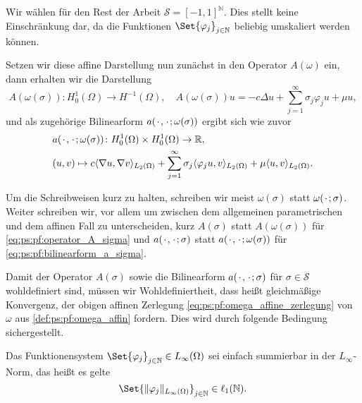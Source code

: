 \begin{Bemerkung}
    Wir wählen für den Rest der Arbeit $\mathcal S = [-1, 1]^{\mathbb{N}}$.
    Dies stellt keine Einschränkung dar, da die Funktionen $\Set{ \varphi_{j} }_{j \in \mathbb{N}}$ beliebig umskaliert werden können.
\end{Bemerkung}

Setzen wir diese affine Darstellung nun zunächst in den Operator $A(\omega)$ ein, dann erhalten wir die Darstellung
\begin{equation}
\label{eq:ps:pf:operator_A_sigma}
    A(\omega(\sigma)) \colon H^{1}_{0}(\Omega) \to H^{-1}(\Omega), \quad A(\omega(\sigma)) u = -c \Delta u + \sum_{j = 1}^{\infty} \sigma_{j} \varphi_{j} u + \mu u,
\end{equation}
und als zugehörige Bilinearform $a({\mkern2mu\cdot\mkern2mu}, {\mkern2mu\cdot\mkern2mu}; \omega(\sigma))$ ergibt sich wie zuvor
\begin{equation}
\label{eq:ps:pf:bilinearform_a_sigma}
    \begin{aligned}
    &a({\mkern2mu\cdot\mkern2mu}, {\mkern2mu\cdot\mkern2mu}; \omega(\sigma)) \colon H^{1}_{0}(\Omega) \times H^{1}_{0}(\Omega) \to \mathbb{R}, \\
    &(u, v) \mapsto c\langle\nabla u,\nabla v\rangle_{L_{2}(\Omega)} + \sum_{j = 1}^{\infty} \sigma_{j} \langle\varphi_{j} u,v\rangle_{L_{2}(\Omega)} + \mu \langle u,v\rangle_{L_{2}(\Omega)}.
    \end{aligned}
\end{equation}

\begin{Bemerkung}
    Um die Schreibweisen kurz zu halten, schreiben wir meist $\omega(\sigma)$ statt $\omega({\mkern2mu\cdot\mkern2mu}; \sigma)$.
    Weiter schreiben wir, vor allem um zwischen dem allgemeinen parametrischen und dem affinen Fall zu unterscheiden, kurz $A(\sigma)$ statt $A(\omega(\sigma))$ für \cref{eq:ps:pf:operator_A_sigma} und $a({\mkern2mu\cdot\mkern2mu}, {\mkern2mu\cdot\mkern2mu}; \sigma)$ statt $a({\mkern2mu\cdot\mkern2mu}, {\mkern2mu\cdot\mkern2mu}; \omega(\sigma))$ für \cref{eq:ps:pf:bilinearform_a_sigma}.
\end{Bemerkung}

Damit der Operator $A(\sigma)$ sowie die Bilinearform $a({\mkern2mu\cdot\mkern2mu}, {\mkern2mu\cdot\mkern2mu}; \sigma)$ für $\sigma \in \mathcal S$ wohldefiniert sind, müssen wir Wohldefiniertheit, dass heißt gleichmäßige Konvergenz, der obigen affinen Zerlegung \cref{eq:ps:pf:omega_affine_zerlegung} von $\omega$ aus \cref{def:ps:pf:omega_affin} fordern.
Dies wird durch folgende Bedingung sichergestellt.
\begin{Annahme}
    Das Funktionensystem $\Set{ \varphi_{j} }_{j \in \mathbb{N}} \in L_{\infty}(\Omega)$ sei einfach summierbar in der $L_{\infty}$-Norm, das heißt es gelte
    \begin{equation}
        \Set{ \norm{\varphi_{j}}_{L_{\infty}(\Omega) } }_{j \in \mathbb{N}} \in \ell_{1}(\mathbb{N}).
    \end{equation}
\end{Annahme}

